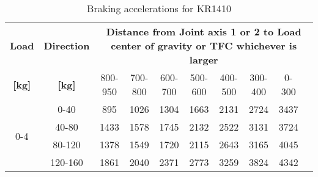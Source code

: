 \begin{table}[h]
    \centering
    \renewcommand{\arraystretch}{1.2} %
    \setlength{\tabcolsep}{4pt} %
    \begin{tabular}{|c|c|*{8}{c|}}
        \hline
        \textbf{Load} & \textbf{Direction} & 
        \multicolumn{8}{c|}{\textbf{Distance from Joint axis 1 or 2 to Load center of gravity or TFC whichever is larger}} \\
        \cline{3-10}
        \textbf{[kg]} & \textbf{[kg]} & 800-950 & 700-800 & 600-700 & 500-600 & 400-500 & 300-400 & 0-300 \\
        \hline
        \multirow{4}{*}{0-4}  & 0-40  & 895  & 1026 & 1304 & 1663 & 2131 & 2724 & 3437 \\
                              & 40-80 & 1433 & 1578 & 1745 & 2132 & 2522 & 3131 & 3724 \\
                              & 80-120 & 1378 & 1549 & 1720 & 2115 & 2643 & 3165 & 4045 \\
                              & 120-160 & 1861 & 2040 & 2371 & 2773 & 3259 & 3824 & 4342 \\
        \hline
    \end{tabular}
    \caption{Braking accelerations for KR1410}
    \label{tab:braking_accelerations}
\end{table}
